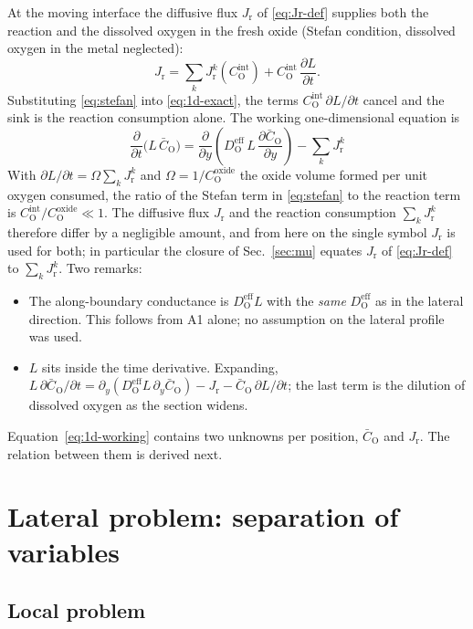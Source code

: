\documentclass[12pt]{article}
\newcommand{\eff}{\mathrm{eff}}
\newcommand{\intf}{\mathrm{int}}
\newcommand{\Ox}{\mathrm{O}}
\newcommand{\D}{D_{\Ox}^{\eff}}
\newcommand{\Cb}{\bar{C}_{\Ox}}
\newcommand{\Ci}{C_{\Ox}^{\intf}}
\newcommand{\Jr}{J_{\mathrm{r}}}
\begin{document}
At the moving interface the diffusive flux $\Jr$ of \eqref{eq:Jr-def} supplies both
the reaction and the dissolved oxygen in the fresh oxide (Stefan condition, dissolved
oxygen in the metal neglected):
\begin{equation}
\Jr=\sum_k\Jr^{k}(\Ci)+\Ci\,\frac{\partial L}{\partial t}.
\label{eq:stefan}
\end{equation}
Substituting \eqref{eq:stefan} into \eqref{eq:1d-exact}, the terms
$\Ci\,\partial L/\partial t$ cancel and the sink is the reaction consumption alone.
The working one-dimensional equation is
\begin{equation}
\boxed{\;
\frac{\partial}{\partial t}\bigl(L\,\Cb\bigr)
 =\frac{\partial}{\partial y}\!\left(\D\,L\,\frac{\partial\Cb}{\partial y}\right)
  -\sum_k\Jr^{k}
\;}
\label{eq:1d-working}
\end{equation}
With $\partial L/\partial t=\Omega\sum_k\Jr^k$ and $\Omega=1/C_{\Ox}^{\mathrm{oxide}}$
the oxide volume formed per unit oxygen consumed, the ratio of the Stefan term in
\eqref{eq:stefan} to the reaction term is $\Ci/C_{\Ox}^{\mathrm{oxide}}\ll1$. The
diffusive flux $\Jr$ and the reaction consumption $\sum_k\Jr^k$ therefore differ by a
negligible amount, and from here on the single symbol $\Jr$ is used for both; in
particular the closure of Sec.~\ref{sec:mu} equates $\Jr$ of \eqref{eq:Jr-def} to
$\sum_k\Jr^k$.
Two remarks:
\begin{itemize}
  \item The along-boundary conductance is $\D L$ with the \emph{same} $\D$ as in the
        lateral direction. This follows from A1 alone; no assumption on the lateral
        profile was used.
  \item $L$ sits inside the time derivative. Expanding,
        $L\,\partial\Cb/\partial t=\partial_y(\D L\,\partial_y\Cb)-\Jr-\Cb\,\partial L/\partial t$;
        the last term is the dilution of dissolved oxygen as the section widens.
\end{itemize}
Equation~\eqref{eq:1d-working} contains two unknowns per position, $\Cb$ and $\Jr$.
The relation between them is derived next.

\section{Lateral problem: separation of variables}
\label{sec:mode}

\subsection{Local problem}
\end{document}
